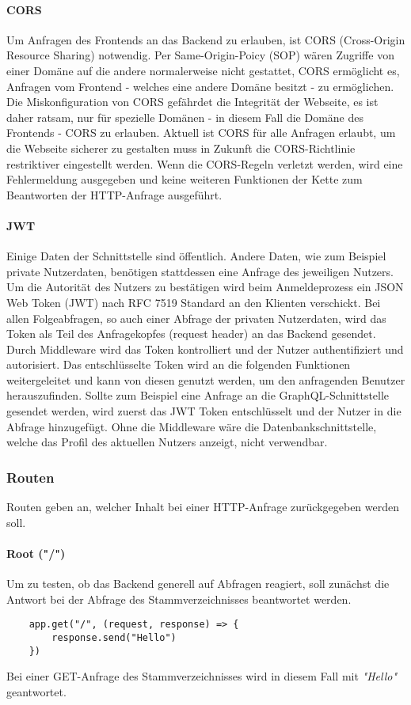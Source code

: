 \paragraph{CORS}
Um Anfragen des Frontends an das Backend zu erlauben, ist CORS (Cross-Origin Resource Sharing) notwendig. Per Same-Origin-Poicy (SOP) wären Zugriffe von einer Domäne auf die andere normalerweise nicht gestattet, CORS ermöglicht es, Anfragen vom Frontend - welches eine andere Domäne besitzt - zu ermöglichen. Die Miskonfiguration von CORS gefährdet die Integrität der Webseite, es ist daher ratsam, nur für spezielle Domänen - in diesem Fall die Domäne des Frontends - CORS zu erlauben. Aktuell ist CORS für alle Anfragen erlaubt, um die Webseite sicherer zu gestalten muss in Zukunft die CORS-Richtlinie restriktiver eingestellt werden. Wenn die CORS-Regeln verletzt werden, wird eine Fehlermeldung ausgegeben und keine weiteren Funktionen der Kette zum Beantworten der HTTP-Anfrage ausgeführt.

\paragraph{JWT}
Einige Daten der Schnittstelle sind öffentlich. Andere Daten, wie zum Beispiel private Nutzerdaten, benötigen stattdessen eine Anfrage des jeweiligen Nutzers. Um die Autorität des Nutzers zu bestätigen wird beim Anmeldeprozess ein JSON Web Token (JWT) nach RFC 7519 Standard an den Klienten verschickt\cite{RFC7519}. Bei allen Folgeabfragen, so auch einer Abfrage der privaten Nutzerdaten, wird das Token als Teil des Anfragekopfes (request header) an das Backend gesendet. Durch Middleware wird das Token kontrolliert und der Nutzer authentifiziert und autorisiert. Das entschlüsselte Token wird an die folgenden Funktionen weitergeleitet und kann von diesen genutzt werden, um den anfragenden Benutzer herauszufinden. Sollte zum Beispiel eine Anfrage an die GraphQL-Schnittstelle gesendet werden, wird zuerst das JWT Token entschlüsselt und der Nutzer in die Abfrage hinzugefügt. Ohne die Middleware wäre die Datenbankschnittstelle, welche das Profil des aktuellen Nutzers anzeigt, nicht verwendbar.

\subsubsection{Routen}
Routen geben an, welcher Inhalt bei einer HTTP-Anfrage zurückgegeben werden soll.

\paragraph{Root ("/")}
Um zu testen, ob das Backend generell auf Abfragen reagiert, soll zunächst die Antwort bei der Abfrage des Stammverzeichnisses beantwortet werden.
\begin{lstlisting}
    app.get("/", (request, response) => {
        response.send("Hello")
    })
\end{lstlisting}
Bei einer GET-Anfrage des Stammverzeichnisses wird in diesem Fall mit \textit{"Hello"} geantwortet.

